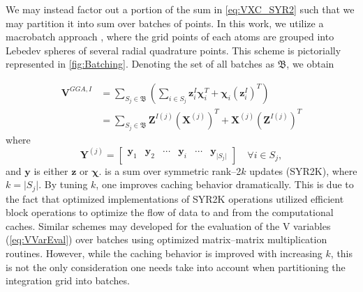 We may instead factor out a portion of the sum in \cref{eq:VXC_SYR2} such that
we may partition it into sum over batches of points.  In this work, we utilize a
macrobatch approach \cite{Frisch96_213}, where the grid points of each atoms are
grouped  into Lebedev spheres \cite{Lebedev77_99} of several radial quadrature points. This scheme
is pictorially represented in \cref{fig:Batching}. Denoting the set of all batches
as $\mathfrak B$, we obtain

\begin{align}
\label{eq:VXC_SYR2K}
\mathbf{V}^{GGA,I} &= \sum_{S_j \in \mathfrak B} \left(\sum_{i\in S_j} \mathbf{z}^I_i \boldsymbol{\chi}_i^T + \boldsymbol{\chi}_i \left(\mathbf{z}^I_i\right)^T \right) \nonumber \\
&= \sum_{S_j \in \mathfrak B} \mathbf{Z}^{I(j)} \left(\mathbf{X}^{(j)}\right)^T + \mathbf{X}^{(j)} \left(\mathbf{Z}^{I(j)}\right)^T
\end{align}
where
\begin{equation}
\mathbf{Y}^{(j)} = \begin{bmatrix} \mathbf{y}_1 & \mathbf{y}_{2} & \cdots & \mathbf{y}_i & \cdots &\mathbf{y}_{\vert S_j \vert} \end{bmatrix} \quad \forall i\in S_j,
\end{equation}
and $\mathbf{y}$ is either $\mathbf{z}$ or $\boldsymbol{\chi}$.  is a sum over symmetric rank--2$k$ updates (SYR2K), where $k = \vert S_j \vert$. By tuning
$k$, one improves caching behavior dramatically. This is due to the fact that optimized implementations of SYR2K operations utilized efficient block
operations to optimize the flow of data to and from the computational caches. 
 Similar schemes may
developed for the evaluation of the V variables (\cref{eq:VVarEval}) over batches using optimized matrix--matrix multiplication routines. However, while the caching behavior
is improved with increasing $k$, this is not the only consideration one needs take into account when partitioning the integration grid into batches.

